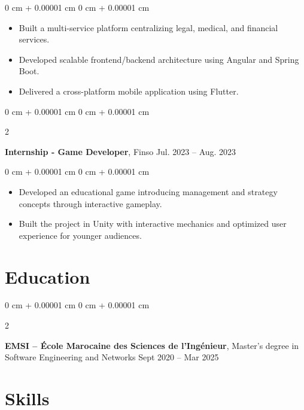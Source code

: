 \documentclass[10pt, letterpaper]{article}
\newenvironment{highlights}{
    \begin{itemize}[
        topsep=0.10 cm,
        parsep=0.10 cm,
        partopsep=0pt,
        itemsep=0pt,
        leftmargin=0 cm + 10pt
    ]
}{
    \end{itemize}
} %
\newenvironment{onecolentry}{
    \begin{adjustwidth}{
        0 cm + 0.00001 cm
    }{
        0 cm + 0.00001 cm
    }
}{
    \end{adjustwidth}
} %
\newenvironment{twocolentry}[2][]{
    \onecolentry
    \def\secondColumn{#2}
    \setcolumnwidth{\fill, 4.5 cm}
    \begin{paracol}{2}
}{
    \switchcolumn \raggedleft \secondColumn
    \end{paracol}
    \endonecolentry
} %
\begin{document}
        \vspace{0.10 cm}
        \begin{onecolentry}
            \begin{highlights}
\item Built a multi-service platform centralizing legal, medical, and financial services.
    \item Developed scalable frontend/backend architecture using Angular and Spring Boot.
    \item Delivered a cross-platform mobile application using Flutter.
    
            \end{highlights}
        \end{onecolentry}



        \vspace{0.2 cm}

        \begin{twocolentry}{
            Jul. 2023 – Aug. 2023
        }
            \textbf{Internship - Game Developer}, Finso\end{twocolentry}

        \vspace{0.10 cm}
        \begin{onecolentry}
            \begin{highlights}
                \item Developed an educational game introducing management and strategy concepts through interactive gameplay.
                \item Built the project in Unity with interactive mechanics and optimized user experience for younger audiences.
            \end{highlights}
        \end{onecolentry}
    \section{Education}



        
        \begin{twocolentry}{
            Sept 2020 – Mar 2025
        }
            \textbf{EMSI – École Marocaine des Sciences de l’Ingénieur}, Master’s degree in Software Engineering and Networks \end{twocolentry}

   

    \section{Skills}
\end{document}
